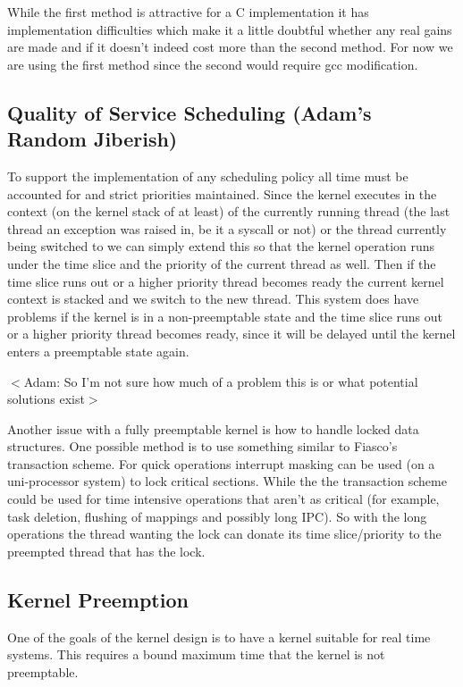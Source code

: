 \documentclass[a4paper,10pt,twoside]{article}
\begin{document}
While the first method is attractive for a C implementation it has
implementation difficulties which make it a little doubtful whether any real
gains are made and if it doesn't indeed cost more than the second method.
For now we are using the first method since the second would require gcc
modification.

\subsection{Quality of Service Scheduling (Adam's Random Jiberish)}

To support the implementation of any scheduling policy all time must be
accounted for and strict priorities maintained. Since the kernel executes in
the context (on the kernel stack of at least) of the currently running thread
(the last thread an exception was raised in, be it a syscall or not) or the
thread currently being switched to we can simply extend this so that the
kernel operation runs under the time slice and the priority of the current
thread as well. Then if the time slice runs out or a higher priority thread
becomes ready the current kernel context is stacked and we switch to the new
thread. This system does have problems if the kernel is in a non-preemptable
state and the time slice runs out or a higher priority thread becomes ready,
since it will be delayed until the kernel enters a preemptable state again. 

$<$Adam: So I'm not sure how much of a problem this is or what potential
solutions exist$>$

Another issue with a fully preemptable kernel is how to handle locked data
structures. One possible method is to use something similar to Fiasco's
transaction scheme. For quick operations interrupt masking can be used (on a
uni-processor system) to lock critical sections. While the the transaction
scheme could be used for time intensive operations that aren't as critical
(for example, task deletion, flushing of mappings and possibly long IPC). So
with the long operations the thread wanting the lock can donate its time
slice/priority to the preempted thread that has the lock. 

\subsection{Kernel Preemption}

One of the goals of the kernel design is to have a kernel suitable for real
time systems. This requires a bound maximum time that the kernel is not
preemptable.
\end{document}

